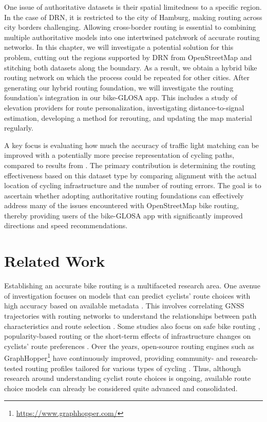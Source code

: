 One issue of authoritative datasets is their spatial limitedness to a specific region. In the case of DRN, it is restricted to the city of Hamburg, making routing across city borders challenging. Allowing cross-border routing is essential to combining multiple authoritative models into one intertwined patchwork of accurate routing networks. In this chapter, we will investigate a potential solution for this problem, cutting out the regions supported by DRN from OpenStreetMap and stitching both datasets along the boundary. As a result, we obtain a hybrid bike routing network on which the process could be repeated for other cities. After generating our hybrid routing foundation, we will investigate the routing foundation's integration in our bike-GLOSA app. This includes a study of elevation providers for route personalization, investigating distance-to-signal estimation, developing a method for rerouting, and updating the map material regularly.

A key focus is evaluating how much the accuracy of traffic light matching can be improved with a potentially more precise representation of cycling paths, compared to results from . The primary contribution is determining the routing effectiveness based on this dataset type by comparing alignment with the actual location of cycling infrastructure and the number of routing errors. The goal is to ascertain whether adopting authoritative routing foundations can effectively address many of the issues encountered with OpenStreetMap bike routing, thereby providing users of the bike-GLOSA app with significantly improved directions and speed recommendations.

\section{Related Work}

Establishing an accurate bike routing is a multifaceted research area. One avenue of investigation focuses on models that can predict cyclists' route choices with high accuracy based on available metadata \cite{dill_understanding_2008, ghanayim_modelling_2018, huber_modelling_2021}. This involves correlating GNSS trajectories with routing networks to understand the relationships between path characteristics and route selection \cite{sultan_extracting_2017, huber_modelling_2021}. Some studies also focus on safe bike routing \cite{loidl_online_2018}, popularity-based routing \cite{bergman_conflation_2016} or the short-term effects of infrastructure changes on cyclists' route preferences \cite{yeboah_route_2015, pritchard_does_2019}. Over the years, open-source routing engines such as GraphHopper\footnote{\url{https://www.graphhopper.com/}} have continuously improved, providing community- and research-tested routing profiles tailored for various types of cycling \cite{krismer_elevation_2016}. Thus, although research around understanding cyclist route choices is ongoing, available route choice models can already be considered quite advanced and consolidated.


